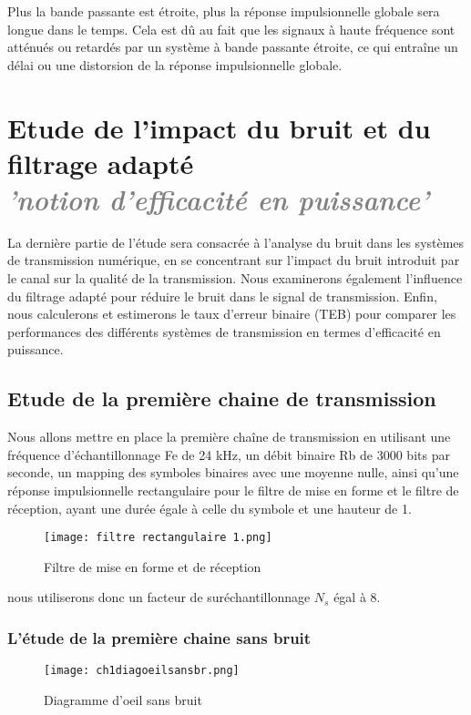 \documentclass[11pt]{article}
\newcommand{\Gray}[1]{\textcolor{gray}{\textit{#1}}}
\begin{document}
Plus la bande passante est étroite, plus la réponse impulsionnelle globale sera longue dans le temps. Cela est dû au fait que les signaux à haute fréquence sont atténués ou retardés par un système à bande passante étroite, ce qui entraîne un délai ou une distorsion de la réponse impulsionnelle globale.

\section{Etude de l’impact du bruit et du filtrage adapté\\ \Gray{'notion d’efficacité en puissance'}}

La dernière partie de l'étude sera consacrée à l'analyse du bruit dans les systèmes de transmission numérique, en se concentrant sur l'impact du bruit introduit par le canal sur la qualité de la transmission. Nous examinerons également l'influence du filtrage adapté pour réduire le bruit dans le signal de transmission. Enfin, nous calculerons et estimerons le taux d'erreur binaire (TEB) pour comparer les performances des différents systèmes de transmission en termes d'efficacité en puissance.
    \subsection{Etude de la première chaine de transmission}
Nous allons mettre en place la première chaîne de transmission en utilisant une fréquence d'échantillonnage Fe de 24 kHz, un débit binaire Rb de 3000 bits par seconde, un mapping des symboles binaires avec une moyenne nulle, ainsi qu'une réponse impulsionnelle rectangulaire pour le filtre de mise en forme et le filtre de réception, ayant une durée égale à celle du symbole et une hauteur de 1. 

\begin{figure}[ht!]
            \centering
            \texttt{[image: filtre rectangulaire 1.png]}
            \caption{Filtre de mise en forme et de réception
            \label{fig : FiltreRec1}}
\end{figure}

nous utiliserons donc un facteur de suréchantillonnage $N_s$ égal à 8.

\subsubsection{L'étude de la première chaine sans bruit}
\begin{figure}[ht!]
            \centering
            \texttt{[image: ch1diagoeilsansbr.png]}
            \caption{Diagramme d'oeil sans bruit
            \label{fig : OeilChaine1}}
\end{figure}
\end{document}
